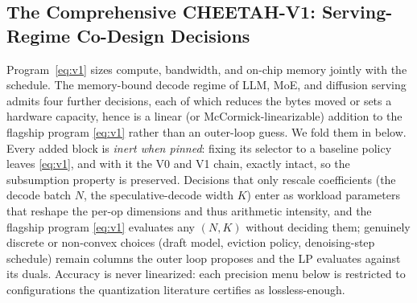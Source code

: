 \subsection{The Comprehensive CHEETAH-V1: Serving-Regime Co-Design Decisions}\label{sec:v3_levers}
Program~\eqref{eq:v1} sizes compute, bandwidth, and on-chip memory jointly with
the schedule. The memory-bound decode regime of LLM, MoE, and diffusion serving
admits four further decisions, each of which reduces the bytes moved or sets a
hardware capacity, hence is a linear (or McCormick-linearizable) addition to
the flagship program \eqref{eq:v1} rather than an outer-loop guess. We fold them in below. Every added block is
\emph{inert when pinned}: fixing its selector to a baseline policy leaves
\eqref{eq:v1}, and with it the V0 and V1 chain, exactly intact, so the subsumption
property is preserved. Decisions that only rescale coefficients (the decode batch
$N$, the speculative-decode width $K$) enter as workload parameters that reshape
the per-op dimensions and thus arithmetic intensity, and the flagship program
\eqref{eq:v1} evaluates any $(N,K)$ without deciding them; genuinely discrete or non-convex choices (draft
model, eviction policy, denoising-step schedule) remain columns the outer loop
proposes and the LP evaluates against its duals. Accuracy is never linearized: each
precision menu below is restricted to configurations the quantization literature
certifies as lossless-enough.


